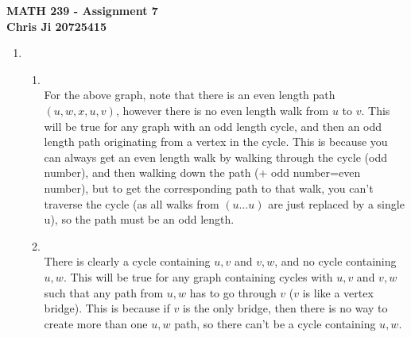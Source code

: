 \documentclass[10pt,english]{article}
\begin{document}
\noindent \begin{center}
\textbf{\large{}MATH 239 - Assignment 7}\\
\textbf{\large{}Chris Ji 20725415}
\par\end{center}{\large \par}
\medskip{}

\begin{enumerate}
\item \begin{enumerate}
    \item \leavevmode\vadjust{\vspace{-\baselineskip}}\newline
     \\ 
For the above graph, note that there is an even length path $(u,w,x,u,v)$, however there is no even length walk from $u$ to $v$. This will be true for any graph with an odd length cycle, and then an odd length path originating from a vertex in the cycle. This is because you can always get an even length walk by walking through the cycle (odd number), and then walking down the path (+ odd number=even number), but to get the corresponding path to that walk, you can't traverse the cycle (as all walks from $(u\ldots u)$ are just replaced by a single u), so the path must be an odd length. 

    \item \leavevmode\vadjust{\vspace{-\baselineskip}}\newline
     \\ 
There is clearly a cycle containing $u,v$ and $v,w$, and no cycle containing $u,w$. This will be true for any graph containing cycles with $u,v$ and $v,w$ such that any path from $u,w$ has to go through $v$ ($v$ is like a vertex bridge). This is because if $v$ is the only bridge, then there is no way to create more than one $u,w$ path, so there can't be a cycle containing $u,w$. 


\end{enumerate}
\end{enumerate}
\end{document}
